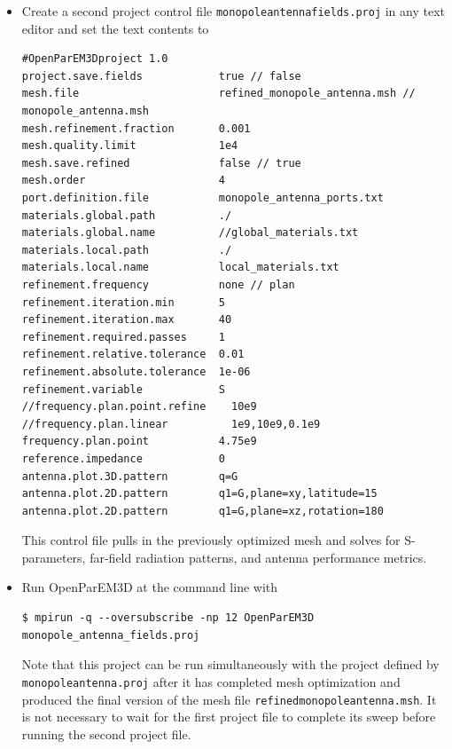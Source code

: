 \documentclass[titlepage]{article}
\renewcommand\_{\textunderscore\linebreak[1]}
\begin{document}
\begin{itemize}
\item Create a second project control file \texttt{monopole\_antenna\_fields.proj} in any text editor and set the text contents to
\begin{Verbatim}[fontsize=\small]
#OpenParEM3Dproject 1.0
project.save.fields            true // false
mesh.file                      refined_monopole_antenna.msh // monopole_antenna.msh
mesh.refinement.fraction       0.001
mesh.quality.limit             1e4
mesh.save.refined              false // true
mesh.order                     4
port.definition.file           monopole_antenna_ports.txt
materials.global.path          ./
materials.global.name          //global_materials.txt
materials.local.path           ./
materials.local.name           local_materials.txt
refinement.frequency           none // plan
refinement.iteration.min       5
refinement.iteration.max       40
refinement.required.passes     1
refinement.relative.tolerance  0.01
refinement.absolute.tolerance  1e-06
refinement.variable            S
//frequency.plan.point.refine    10e9
//frequency.plan.linear          1e9,10e9,0.1e9
frequency.plan.point           4.75e9
reference.impedance            0
antenna.plot.3D.pattern        q=G
antenna.plot.2D.pattern        q1=G,plane=xy,latitude=15
antenna.plot.2D.pattern        q1=G,plane=xz,rotation=180
\end{Verbatim}
\noindent This control file pulls in the previously optimized mesh and solves for S-parameters, far-field radiation patterns, and antenna performance metrics.

\item Run OpenParEM3D at the command line with
\begin{Verbatim}[fontsize=\small]
   $ mpirun -q --oversubscribe -np 12 OpenParEM3D monopole_antenna_fields.proj
\end{Verbatim}
\noindent Note that this project can be run simultaneously with the project defined by \texttt{monopole\_antenna.proj} after it has completed mesh optimization and produced the final version of the mesh file \texttt{refined\_monopole\_antenna.msh}.  It is not necessary to wait for the first project file to complete its sweep before running the second project file.


\end{itemize}
\end{document}
